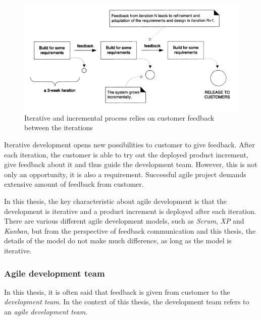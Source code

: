 \documentclass[english,12pt,a4paper,pdftex]{article}
\begin{document}
\begin{figure}[htb]
\begin{center}
\includegraphics[width=1.0\textwidth]{iterative_and_incremental.png}
\end{center}
\caption{Iterative and incremental process relies on customer feedback between the iterations \citep{larman2004}}
\label{fig:iterative_and_incremental}
\end{figure}

Iterative development opens new possibilities to customer to give feedback. After each iteration, the customer is able to try out the deployed product increment, give feedback about it and thus guide the development team. However, this is not only an opportunity, it is also a requirement. Successful agile project demands extensive amount of feedback from customer.

In this thesis, the key characteristic about agile development is that the development is iterative and a product increment is deployed after each iteration. There are various different agile development models, such as \emph{Scrum}, \emph{\acl{XP}} and \emph{Kanban}, but from the perspective of feedback communication and this thesis, the details of the model do not make much difference, as long as the model is iterative.

\subsubsection{Agile development team}

In this thesis, it is often said that feedback is given from customer to the \emph{development team}. In the context of this thesis, the development team refers to an \emph{agile development team}. 
\end{document}
